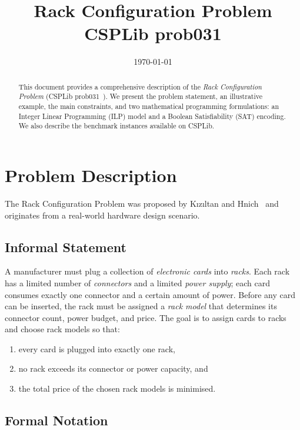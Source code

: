 \documentclass[11pt,a4paper]{article}
\title{\textbf{Rack Configuration Problem}\\[4pt]
       \large CSPLib prob031}
\author{}
\date{\today}
\begin{document}
\maketitle

\begin{abstract}
This document provides a comprehensive description of the
\emph{Rack Configuration Problem} (CSPLib prob031~\cite{csplib}).
We present the problem statement, an illustrative example,
the main constraints, and two mathematical programming formulations:
an Integer Linear Programming (ILP) model and a Boolean Satisfiability
(SAT) encoding.  We also describe the benchmark instances available
on CSPLib.
\end{abstract}

\tableofcontents
\newpage

\section{Problem Description}
\label{sec:description}

The Rack Configuration Problem was proposed by
Kızıltan and Hnich~\cite{Kiziltan01symmetrybreaking}
and originates from a real-world hardware design scenario.

\subsection{Informal Statement}

A manufacturer must plug a collection of \emph{electronic cards} into
\emph{racks}.  Each rack has a limited number of \emph{connectors} and
a limited \emph{power supply}; each card consumes exactly one connector
and a certain amount of power.
Before any card can be inserted, the rack must be assigned a
\emph{rack model} that determines its connector count, power budget,
and price.
The goal is to assign cards to racks and choose rack models so that:
\begin{enumerate}[label=(\roman*)]
  \item every card is plugged into exactly one rack,
  \item no rack exceeds its connector or power capacity, and
  \item the total price of the chosen rack models is minimised.
\end{enumerate}

\subsection{Formal Notation}
\end{document}
